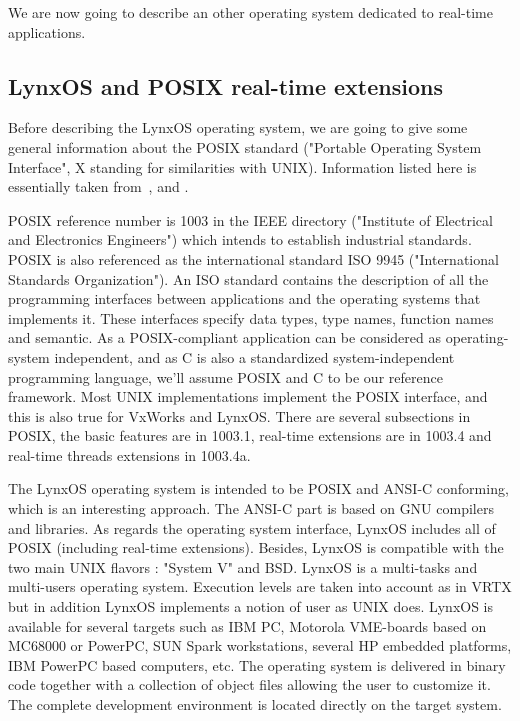 \documentclass[10pt]{report}
\begin{document}
We are now going to describe an other operating system dedicated
to real-time applications.

\subsection{LynxOS and POSIX real-time extensions}

Before describing the LynxOS operating system, we are going to give
some general information about the POSIX standard ("Portable
Operating System Interface", X standing for similarities with
UNIX). Information listed here is essentially taken from~\cite{LYNX}, \cite{JMR:93} and \cite{JMR:94}.

POSIX reference number is 1003 in the IEEE directory ("Institute
of Electrical and Electronics Engineers") which intends to
establish industrial standards. POSIX is also referenced as the
international standard ISO 9945 ("International Standards
Organization"). An ISO standard contains the description of all
the programming interfaces between applications and the operating systems that
implements it. These interfaces specify data types, type names,
function names and semantic. As a POSIX-compliant application can
be considered as operating-system independent, and as C is also a
standardized system-independent programming language, we'll
assume POSIX and C to be our reference framework. Most UNIX
implementations implement the POSIX interface, and this is also
true for VxWorks and LynxOS. There are several subsections in
POSIX, the basic features are in 1003.1, real-time extensions are
in 1003.4 and real-time threads extensions in 1003.4a.

The LynxOS operating system is intended to be POSIX and ANSI-C
conforming, which is an interesting approach. The ANSI-C part is
based on GNU compilers and libraries. As regards the operating
system interface, LynxOS includes all of POSIX (including real-time
extensions). Besides, LynxOS is compatible with the two main UNIX
flavors : "System V" and BSD. LynxOS is a multi-tasks and
multi-users operating system. Execution levels are taken into account as in 
VRTX but in addition LynxOS implements a notion of user as UNIX does. 
LynxOS is available for several targets such as IBM PC,
Motorola VME-boards based on MC68000 or PowerPC, SUN Spark
workstations, several HP embedded platforms, IBM PowerPC based
computers, etc. The operating system is delivered in binary code
together with a collection of object files allowing the user to customize
it. The complete development environment is located directly on
the target system.
\end{document}
